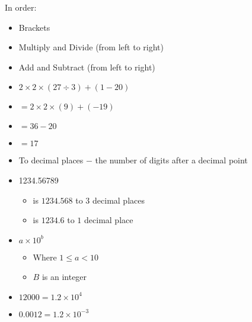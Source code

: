 \begin{frame}
In order:
\begin{itemize}
	\item Brackets
	\item Multiply and Divide (from left to right)
	\item Add and Subtract (from left to right)
	\vspace*{.35cm}
	\item $2 \times 2 \times  (27 \div 3) + (1 - 20)$
	\item $= 2 \times 2 \times (9) + (-19)$
	\item $= 36 - 20$
	\item $= 17$
\end{itemize}
\end{frame}
\begin{frame}

\begin{itemize}
\item To decimal places $-$ the number of digits after a decimal point
\item 1234.56789
\vspace*{.35cm}
\begin{itemize}
	\item is $1234.568$ to $3$ decimal places
	\item is $1234.6$ to $1$ decimal place
\end{itemize}
\end{itemize}
\end{frame}
\begin{frame}
\begin{itemize}
	\item $a \times 10^b$
	\begin{itemize}
		\item Where $1 \le a < 10$
		\item $B$ is an integer
	\end{itemize}
	\vspace*{.35cm}
		\item $12000 = 1.2 \times 10^4$
		\item $0.0012 = 1.2 \times 10^{-3}$
	\end{itemize}
\end{frame}
